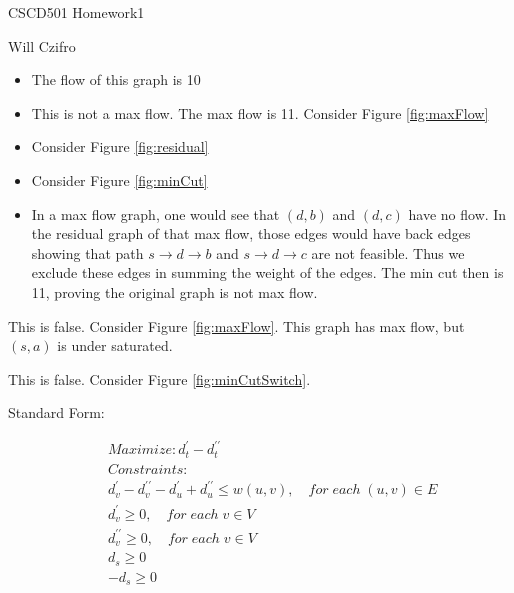 \documentclass[11pt]{article}
\begin{document}
\begin{center}
  {\LARGE CSCD501 Homework1}

\bigskip 

{\Large Will Czifro}

\end{center}

\bigskip


\begin{itemize}
\item The flow of this graph is 10
\item This is not a max flow. The max flow is 11. Consider Figure \ref{fig:maxFlow}
\item Consider Figure \ref{fig:residual}
\item Consider Figure \ref{fig:minCut}
\item In a max flow graph, one would see that $(d,b)$ and $(d,c)$ have no flow. In the residual graph of that max flow, those edges would have back edges showing that path $s \rightarrow d \rightarrow b$ and $s \rightarrow d \rightarrow c$ are not feasible. Thus we exclude these edges in summing the weight of the edges. The min cut then is 11, proving the original graph is not max flow.
\end{itemize}

\bigskip


This is false. Consider Figure \ref{fig:maxFlow}. This graph has max flow, but $(s,a)$ is under saturated.

\bigskip


This is false. Consider Figure \ref{fig:minCutSwitch}.

\bigskip


Standard Form:

\begin{align*}
\quad & Maximize: d_t^\prime - d_t^{\prime\prime}\\
      & Constraints:\\
      & d_v^\prime - d_v^{\prime\prime} - d_u^\prime + d_u^{\prime\prime} \leq w(u,v), \quad for\;each\;(u,v) \in E\\
      & d_v^\prime \geq 0, \quad for\;each\;v \in V\\
      & d_v^{\prime\prime} \geq 0, \quad for\;each\;v \in V\\
      & d_s \geq 0\\
      & -d_s \geq 0
\end{align*}
\end{document}

